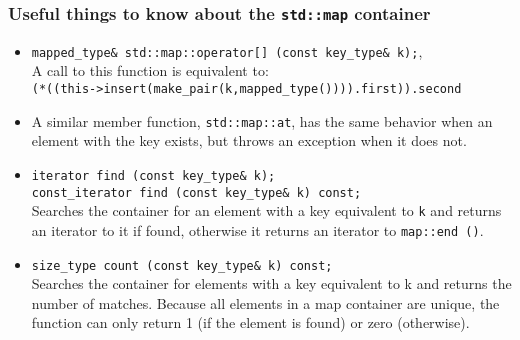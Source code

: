 \documentclass[smaller,a4paper]{beamer}
\newcommand{\cpp}[1]{\lstinline!#1!}
\begin{document}
\begin{frame}\frametitle{Useful things to know about the \cpp{std::map} container}
\begin{itemize}

\item \cpp{mapped_type& std::map::operator[] (const key_type& k);}, \\
A call to this function is equivalent to: \\
\cpp{(*((this->insert(make_pair(k,mapped_type()))).first)).second}

\item A similar member function, \cpp{std::map::at}, has the same 
      behavior when an element with the key exists, but throws an 
      exception when it does not.
      
\item \cpp{iterator find (const key_type& k);} \\
      \cpp{const_iterator find (const key_type& k) const;}\\
      Searches the container for an element with a key equivalent to \cpp{k} and returns 
      an iterator to it if found, otherwise it returns an iterator to \cpp{map::end ()}.

\item \cpp{size_type count (const key_type& k) const;} \\
Searches the container for elements with a key equivalent to k and returns the number of matches.
Because all elements in a map container are unique, the function can only return 1 (if the element is found) or zero (otherwise).

\end{itemize}
\end{frame}
\end{document}
